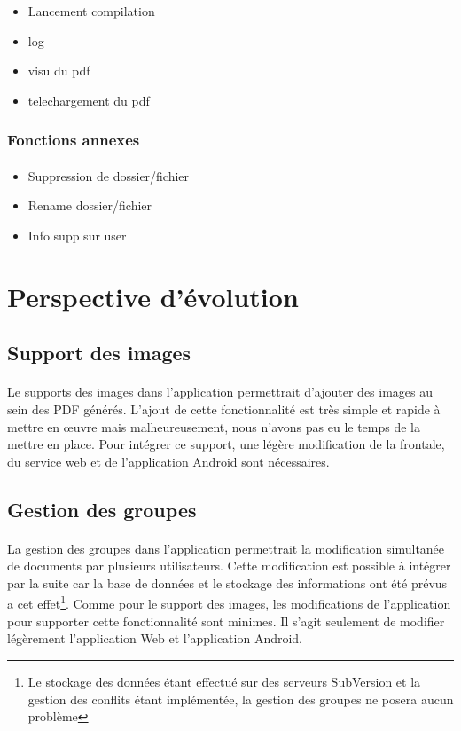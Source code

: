 \documentclass[a4paper,12pt]{article}
\begin{document}
\begin{itemize}
 \item Lancement compilation
 \item log
 \item visu du pdf
 \item telechargement du pdf
\end{itemize}


\subsubsection{Fonctions annexes}
\paragraph*{}
\begin{itemize}
 \item Suppression de dossier/fichier
 \item Rename dossier/fichier
 \item Info supp sur user
\end{itemize}

\newpage
\section{Perspective d'évolution}
\subsection{Support des images}
\paragraph*{}
Le supports des images dans l'application permettrait d'ajouter des images au sein des PDF générés. L'ajout de cette fonctionnalité est très simple et rapide à mettre en \oe uvre mais malheureusement, nous n'avons pas eu le temps de la mettre en place. Pour intégrer ce support, une légère modification de la frontale, du service web et de l'application Android sont nécessaires.

\subsection{Gestion des groupes}
\paragraph*{}
La gestion des groupes dans l'application permettrait la modification simultanée de documents par plusieurs utilisateurs. Cette modification est possible à intégrer par la suite car la base de données et le stockage des informations ont été prévus a cet effet\footnote{Le stockage des données étant effectué sur des serveurs SubVersion et la gestion des conflits étant implémentée, la gestion des groupes ne posera aucun problème}. Comme pour le support des images, les modifications de l'application pour supporter cette fonctionnalité sont minimes. Il s'agit seulement de modifier légèrement l'application Web et l'application Android.
\end{document}
